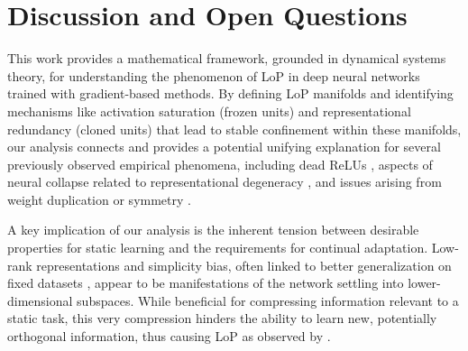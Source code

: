 \documentclass{article}
\begin{document}


\section{Discussion and Open Questions}

This work provides a mathematical framework, grounded in dynamical systems theory, for understanding the phenomenon of LoP in deep neural networks trained with gradient-based methods. By defining LoP manifolds and identifying mechanisms like activation saturation (frozen units) and representational redundancy (cloned units) that lead to stable confinement within these manifolds, our analysis connects and provides a potential unifying explanation for several previously observed empirical phenomena, including dead ReLUs \citep{nair2010rectified}, aspects of neural collapse related to representational degeneracy \citep{papyan2020prevalence}, and issues arising from weight duplication or symmetry \citep{huh2022lowrank}.

A key implication of our analysis is the inherent tension between desirable properties for static learning and the requirements for continual adaptation. Low-rank representations and simplicity bias, often linked to better generalization on fixed datasets \citep{huh2022lowrank, papyan2020prevalence, zhang2017understanding}, appear to be manifestations of the network settling into lower-dimensional subspaces. While beneficial for compressing information relevant to a static task, this very compression hinders the ability to learn new, potentially orthogonal information, thus causing LoP as observed by \citep{dohare2024loss}.
\end{document}
